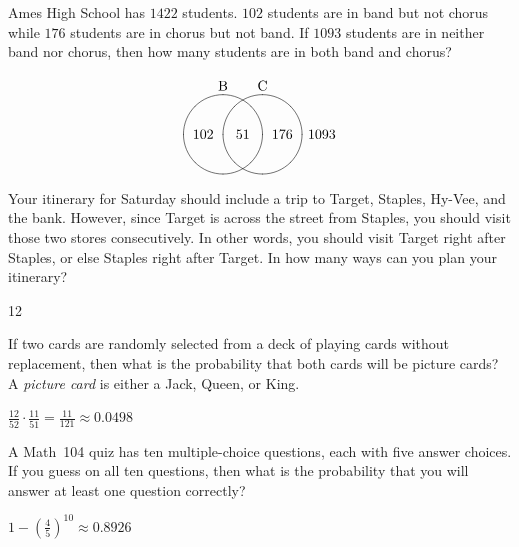 \documentclass[answers,addpoints,12pt]{exam}
\begin{document}
\begin{questions}
\begin{solution}
\end{solution}

\question[12] Ames High School has $1422$ students.
$102$ students are in band but not chorus while
$176$ students are in chorus but not band.
If $1093$ students are in neither band nor chorus,
then how many students are in both band and chorus?
\begin{solution}
\[\begin{xy}<.5cm,0cm>:
(-1,2)*+!D{\text{B}};
(1,2)*+!D{\text{C}};
(-1,0)*\cir<1cm>{};
(1,0)*\cir<1cm>{};
(0,0)*{51};
(-2,0)*{102};
(2,0)*{176};
(4,0)*{1093};
\end{xy}\]
\end{solution}

\question[15] Your itinerary for Saturday should
include a trip to Target, Staples, Hy-Vee, and the bank.
However, since Target is across the street from Staples,
you should visit those two stores consecutively. In other
words, you should visit Target right after Staples, or else
Staples right after Target. In how many ways
can you plan your itinerary?
\begin{solution}12\end{solution}

\question[10] If two cards are randomly selected from a deck
of playing cards without replacement,
then what is the probability that both cards
will be picture cards?  A {\em picture card} is either a Jack, Queen, or King.
\begin{solution}
$\frac{12}{52}\cdot\frac{11}{51}=\frac{11}{121}\approx 0.0498$
\end{solution}

\question[12] A Math~104 quiz has ten multiple-choice
questions, each with five answer choices. If you guess on all
ten questions, then what is the probability that you will answer at
least one question correctly?
\begin{solution}
$1-\left(\frac{4}{5}\right)^{10}\approx 0.8926$
\end{solution}

\end{questions}

\vfill
\begin{center}\gradetable[h][questions]\end{center}
\end{document}
